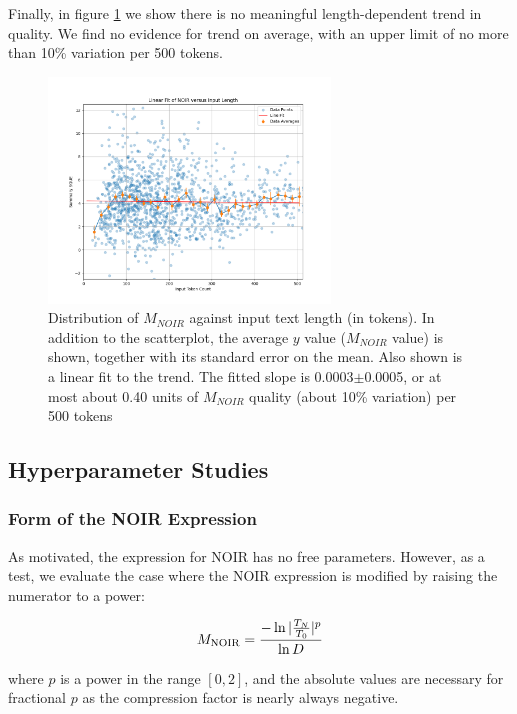\documentclass{article}
\begin{document}
{Finally, in figure \ref{fig:mNOIR_trend} we show there is no meaningful length-dependent trend in quality.  We find no evidence for trend on average, with an upper limit of no more than 10\% variation per 500 tokens.

\begin{figure}
	\centering
	\includegraphics[height=6cm]{Linear_Fit_of_NOIR_versus_Input_Length.png}
	\caption{Distribution of $M_{NOIR}$ against input text length (in tokens). In addition to the scatterplot, the average $y$ value ($M_{NOIR}$ value) is shown, together with its standard error on the mean.  Also shown is a linear fit to the trend.  The fitted slope is 0.0003$\pm$0.0005, or at most about 0.40 units of $M_{NOIR}$ quality (about 10\% variation) per 500 tokens}
	\label{fig:mNOIR_trend}
\end{figure}


\subsection{Hyperparameter Studies}

\subsubsection{Form of the NOIR Expression}

As motivated, the expression for NOIR has no free parameters.  
However, as a test, we evaluate the case where the NOIR expression is modified by raising the numerator to a power:

\begin{equation}
	M_{\rm NOIR} = \frac{-\ln|\frac{T_N}{T_0}|^p}{\ln D}
\end{equation}

where $p$ is a power in the range $\left[0,2\right]$, and the absolute values are necessary for fractional $p$ as the compression factor is nearly always negative.

}
\end{document}
